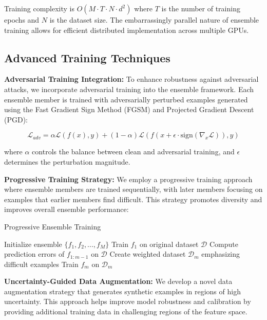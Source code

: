\documentclass[journal]{IEEEtran}
\begin{document}
Training complexity is $O(M \cdot T \cdot N \cdot d^2)$ where $T$ is the number of training epochs and $N$ is the dataset size. The embarrassingly parallel nature of ensemble training allows for efficient distributed implementation across multiple GPUs.

\subsection{Advanced Training Techniques}

\textbf{Adversarial Training Integration:} To enhance robustness against adversarial attacks, we incorporate adversarial training into the ensemble framework. Each ensemble member is trained with adversarially perturbed examples generated using the Fast Gradient Sign Method (FGSM) and Projected Gradient Descent (PGD):

\begin{equation}
\mathcal{L}_{adv} = \alpha \mathcal{L}(f(x), y) + (1-\alpha) \mathcal{L}(f(x + \epsilon \cdot \text{sign}(\nabla_x \mathcal{L})), y)
\end{equation}

where $\alpha$ controls the balance between clean and adversarial training, and $\epsilon$ determines the perturbation magnitude.

\textbf{Progressive Training Strategy:} We employ a progressive training approach where ensemble members are trained sequentially, with later members focusing on examples that earlier members find difficult. This strategy promotes diversity and improves overall ensemble performance:

\begin{algorithm}[t]
\caption{Progressive Ensemble Training}
\begin{algorithmic}[1]
\STATE Initialize ensemble $\{f_1, f_2, ..., f_M\}$
        \STATE Train $f_1$ on original dataset $\mathcal{D}$
    \ELSE
        \STATE Compute prediction errors of $f_{1:m-1}$ on $\mathcal{D}$
        \STATE Create weighted dataset $\mathcal{D}_m$ emphasizing difficult examples
        \STATE Train $f_m$ on $\mathcal{D}_m$
    \ENDIF
\ENDFOR
\end{algorithmic}
\end{algorithm}

\textbf{Uncertainty-Guided Data Augmentation:} We develop a novel data augmentation strategy that generates synthetic examples in regions of high uncertainty. This approach helps improve model robustness and calibration by providing additional training data in challenging regions of the feature space.
\end{document}
